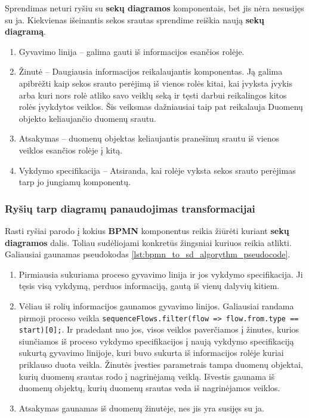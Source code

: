 \documentclass{VUMIFInfBakalaurinis}
\begin{document}
Sprendimas neturi ryšiu su \textbf{sekų diagramos} komponentais, bet jis nėra nesusijęs su ja. Kiekvienas išeinantis sekos srautas sprendime reiškia naują \textbf{sekų diagramą}. 
\begin{enumerate}
	\item Gyvavimo linija – galima gauti iš informacijos esančios rolėje. 
	\item Žinutė – Daugiausia informacijos reikalaujantis komponentas. Ją galima apibrėžti kaip sekos srauto perėjimą iš vienos rolės kitai, kai įvyksta įvykis arba kuri nors rolė atliko savo veiklų seką ir tęsti darbui reikalingos kitos rolės įvykdytos veiklos. Šis veiksmas dažniausiai taip pat reikalauja Duomenų objekto keliaujančio duomenų srautu.
	\item Atsakymas – duomenų objektas keliaujantis pranešimų srautu iš vienos veiklos esančios rolėje į kitą.
	\item Vykdymo specifikacija – Atsiranda, kai rolėje vyksta sekos srauto perėjimas tarp jo jungiamų komponentų.
\end{enumerate} 

\subsubsection{Ryšių tarp diagramų panaudojimas transformacijai}

Rasti ryšiai parodo į kokius \textbf{BPMN} komponentus reikia žiūrėti kuriant \textbf{sekų diagramos} dalis. Toliau sudėliojami konkretūs žingsniai kuriuos reikia atlikti. Galiausiai gaunamas pseudokodas \ref{lst:bpmn_to_sd_algorythm_pseudocode}. 

\begin{enumerate}
	\item Pirmiausia sukuriama proceso gyvavimo linija ir jos vykdymo specifikacija. Ji tęsis visą vykdymą, perduos informaciją, gautą iš vienų dalyvių kitiem. 
	\item Vėliau iš rolių informacijos gaunamos gyvavimo linijos. Galiausiai randama pirmoji proceso veikla \lstinline[columns=fixed]{sequenceFlows.filter(flow => flow.from.type == start)[0];}. Ir pradedant nuo jos, visos veiklos paverčiamos į žinutes, kurios siunčiamos iš proceso vykdymo specifikacijos į naują vykdymo specifikaciją sukurtą gyvavimo linijoje, kuri buvo sukurta iš informacijos rolėje kuriai priklauso duota veikla. Žinutės įvesties parametrais tampa duomenų objektai, kurių duomenų srautas rodo į nagrinėjamą veiklą. Išvestis gaunama iš duomenų objektų, kurių duomenų srautas veda iš nagrinėjamos veiklos. 
	\item Atsakymas gaunamas iš duomenų žinutėje, nes jis yra susijęs su ja. 
\end{enumerate} 
\end{document}
